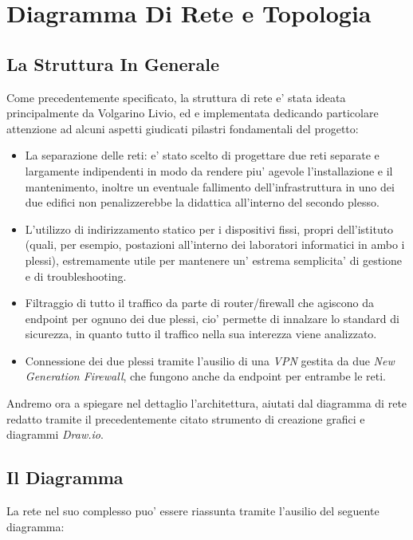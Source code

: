 \documentclass{report}
\begin{document}
	\chapter{Diagramma Di Rete e Topologia}
	\begin{sloppypar}
		\author{Volgarino Livio}
		\section{La Struttura In Generale}
			Come precedentemente specificato, la struttura di rete e' stata ideata principalmente da Volgarino Livio, ed e
			implementata dedicando particolare attenzione ad alcuni aspetti giudicati pilastri fondamentali del progetto:
			\begin{itemize}
				\item La separazione delle reti: e' stato scelto di progettare due reti separate e largamente indipendenti
					in modo da rendere piu' agevole l'installazione e il mantenimento, inoltre un eventuale fallimento
					dell'infrastruttura in uno dei due edifici non penalizzerebbe la didattica all'interno del secondo plesso.
				\item L'utilizzo di indirizzamento statico per i dispositivi fissi, propri dell'istituto (quali, per esempio,
					postazioni all'interno dei laboratori informatici in ambo i plessi), estremamente utile per mantenere un'
					estrema semplicita' di gestione e di troubleshooting.
				\item Filtraggio di tutto il traffico da parte di router/firewall che agiscono da endpoint per ognuno dei due
					plessi, cio' permette di innalzare lo standard di sicurezza, in quanto tutto il traffico nella sua interezza
					viene analizzato.
				\item Connessione dei due plessi tramite l'ausilio di una \emph{VPN} gestita da due \emph{New Generation
					Firewall}, che fungono anche da endpoint per entrambe le reti.
			\end{itemize}
			Andremo ora a spiegare nel dettaglio l'architettura, aiutati dal diagramma di rete redatto tramite il precedentemente
			citato strumento di creazione grafici e diagrammi \emph{Draw.io}.
		\section{Il Diagramma}
			La rete nel suo complesso puo' essere riassunta tramite l'ausilio del seguente diagramma:


\end{sloppypar}
\end{document}
